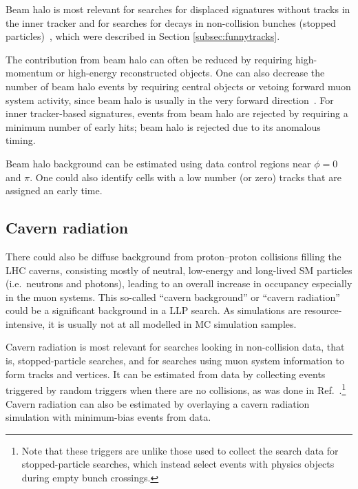 Beam halo is most relevant for searches for displaced signatures without tracks in the inner tracker and for searches for decays in non-collision bunches (stopped particles)~\cite{Khachatryan:2015jha, Chatrchyan:2012dxa, Khachatryan:2010uf}, which were described in Section \ref{subsec:funnytracks}.

The contribution from beam halo can often be reduced by requiring high-momentum or high-energy reconstructed objects. One can also decrease the number of beam halo events by requiring central objects or vetoing forward muon system activity, since beam halo is usually in the very forward direction~\cite{Khachatryan:2015jha, Chatrchyan:2012dxa, Khachatryan:2010uf}. For inner tracker-based signatures, events from beam halo are rejected by requiring a minimum number of early hits; beam halo is rejected due to its anomalous timing.

Beam halo background can be estimated  using data control regions near $\phi=0$ and $\pi$. One could also identify cells with a low number (or zero) tracks that are assigned an early time. %

\subsection{Cavern radiation} %

There could also be diffuse background from proton--proton collisions filling the LHC caverns, consisting mostly of neutral, low-energy and long-lived SM particles (i.e.\ neutrons and photons), leading to an overall increase in occupancy especially in the muon systems. This so-called ``cavern background'' or ``cavern radiation'' could be a significant background in a LLP search. As simulations are resource-intensive, it is usually not at all modelled in MC simulation samples.

Cavern radiation is most relevant for searches looking in non-collision data, that is, stopped-particle searches, and for searches using muon system information to form tracks and vertices. It can be estimated from data by collecting events triggered by random triggers when there are no collisions, as was done in Ref.~\cite{Aad:2013gva}.\footnote{Note that these triggers are unlike those used to collect the search data for stopped-particle searches, which instead select events with physics objects during empty bunch crossings.} Cavern radiation can also be estimated by overlaying a cavern radiation simulation with minimum-bias events from data.

